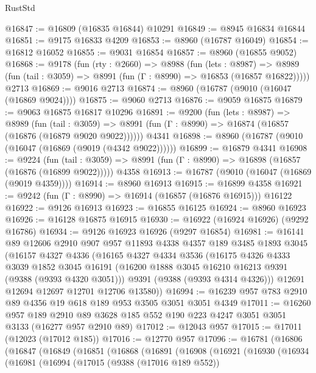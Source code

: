 \begin{lexlean}{RustStd}
\begin{coremodule}
@16847 := @16809 (@16835 @16844) @10291
@16849 := @8945 @16834 @16844
@16851 := @9175 @16833 @4209
@16853 := @8960 (@16787 @16049)
@16854 := @16812 @16052
@16855 := @9031 @16854
@16857 := @8960 (@16855 @9052)
@16868 := @9178
    (fun (rty : @2660) =>
    @8988
      (fun (lets : @8987) =>
      @8989 (fun (tail : @3059) => @8991 (fun (Γ : @8990) => @16853 (@16857 @16822)))))
    @2713
@16869 := @9016 @2713
@16874 := @8960 (@16787 (@9010 (@16047 (@16869 @9024))))
@16875 := @9060 @2713
@16876 := @9059 @16875
@16879 := @9063 @16875 @16817 @10296
@16891 := @9200
    (fun (lets : @8987) =>
    @8989
      (fun (tail : @3059) =>
      @8991 (fun (Γ : @8990) => @16874 (@16857 (@16876 (@16879 @9020 @9022))))))
    @4341
@16898 := @8960 (@16787 (@9010 (@16047 (@16869 (@9019 (@4342 @9022))))))
@16899 := @16879 @4341
@16908 := @9224
    (fun (tail : @3059) => @8991 (fun (Γ : @8990) => @16898 (@16857 (@16876 (@16899 @9022)))))
    @4358
@16913 := @16787 (@9010 (@16047 (@16869 (@9019 @4359))))
@16914 := @8960 @16913
@16915 := @16899 @4358
@16921 := @9242 (fun (Γ : @8990) => @16914 (@16857 (@16876 @16915))) @16122
@16922 := @9126 @16913
@16923 := @16855 @16125
@16924 := @8960 @16923
@16926 := @16128 @16875 @16915
@16930 := @16922 (@16924 @16926) (@9292 @16786)
@16934 := @9126 @16923 @16926 (@9297 @16854)
@16981 := @16141
    @89
    @12606
    @2910
    @907
    @957
    @11893
    @4338
    @4357
    @189
    @3485
    @1893
    @3045
    (@16157
      @4327
      @4336
      (@16165
        @4327
        @4334
        @3536
        (@16175
          @4326
          @4333
          @3039
          @1852
          @3045
          @16191
          (@16200 @1888 @3045 @16210 @16213 @9391 (@9388 (@9393 @4320 @3051)))
          @9391
          (@9388 (@9393 @4314 @4326)))
        @12691
        @12694
        @12697
        @12701
        @12706
        @13580))
@16994 := @16239 @957 @783 @2910 @89 @4356 @19 @618 @189 @953 @3505 @3051 @3051 @4349
@17011 := @16260
    @957
    @189
    @2910
    @89
    @3628
    @185
    @552
    @190
    @223
    @4247
    @3051
    @3051
    @3133
    (@16277 @957 @2910 @89)
@17012 := @12043 @957
@17015 := @17011 (@12023 (@17012 @185))
@17016 := @12770 @957
@17096 := @16781
    (@16806
      (@16847
        (@16849
          (@16851
            (@16868
              (@16891
                (@16908
                  (@16921
                    (@16930
                      (@16934
                        (@16981
                          (@16994
                            (@17015
                              (@9388 (@17016 @189 @552))

\end{coremodule}
\end{lexlean}
